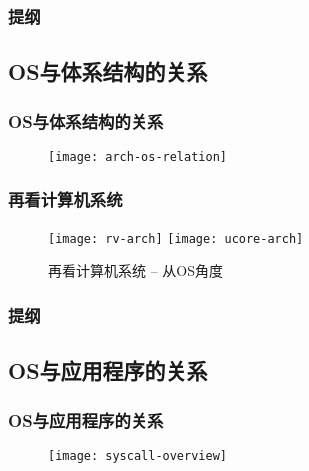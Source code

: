 \begin{frame}
    \frametitle{提纲} 
    \tableofcontents 
\end{frame}


\subsection{OS与体系结构的关系}

\begin{frame}
    
    \frametitle{OS与体系结构的关系}
    
    \begin{figure}
        \centering
        \texttt{[image: arch-os-relation]}
    \end{figure}
    
\end{frame}

\begin{frame}
    
    \frametitle{再看计算机系统}
    
    \begin{figure}
        \centering
        \texttt{[image: rv-arch]}
        \texttt{[image: ucore-arch]}	
        \caption{再看计算机系统 -- 从OS角度}
    \end{figure}
    
    
\end{frame}


\begin{frame}
    \frametitle{提纲} 
    \tableofcontents 
\end{frame}


\subsection{OS与应用程序的关系} %

\begin{frame}
    
    \frametitle{OS与应用程序的关系}
    
    \begin{figure}
        \centering
        \texttt{[image: syscall-overview]}
    \end{figure}
    
\end{frame}


